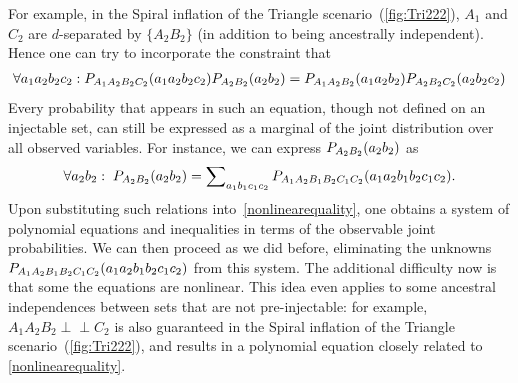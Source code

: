 \documentclass[aps,english,superscriptaddress,onecolumn,twoside,longbibliography,pra,floatfix,fleqn,nofootinbib]{revtex4-1}%
\theoremstyle{definition}
\newcommand{\p}[2][]{{P_{#1}}\parenths{#2}}
\newcommand{\indep}{\perp\!\!\!\!\perp} %
\DeclarePairedDelimiter{\parenths}{\lparen}{\rparen}
\begin{document}
For example, in the Spiral inflation of the Triangle scenario~(\cref{fig:Tri222}), $A_1$ and $C_2$ are $d$-separated by $\{A_2 B_2\}$ (in addition to being ancestrally independent). Hence one can try to incorporate the constraint that 
\begin{align}\label{nonlinearequality}
\forall{a_1 a_2 b_2 c_2}: \p[A_1 A_2 B_2 C_2]{a_1 a_2 b_2 c_2}\p[A_2 B_2]{a_2 b_2}=\p[A_1 A_2 B_2]{a_1 a_2 b_2}\p[A_2 B_2 C_2]{a_2 b_2 c_2}
\end{align}
 Every probability that appears in such an equation, though not defined on an injectable set, can still be expressed as a marginal of the joint distribution over all observed variables.  For instance, we can express $\p[A_2 B_2]{a_2 b_2}$ as
\begin{align}
\forall{a_2 b_2}:\;\p[A_2 B_2]{a_2 b_2} = \sum\nolimits_{a_1 b_1 c_1 c_2}\p[A_1 A_2 B_1 B_2 C_1 C_2]{a_1 a_2 b_1 b_2 c_1 c_2}.
\end{align}
Upon substituting such relations into~\cref{nonlinearequality}, one obtains a system of polynomial equations and inequalities in terms of the observable joint probabilities.  We can then proceed as we did before, eliminating the unknowns $\p[A_1 A_2 B_1 B_2 C_1 C_2]{a_1 a_2 b_1 b_2 c_1 c_2}$ from this system. The additional difficulty now is that some the equations are nonlinear. This idea even applies to some ancestral independences between sets that are not pre-injectable: for example, $A_1 A_2 B_2 \indep C_2$ is also guaranteed in the Spiral inflation of the Triangle scenario~(\cref{fig:Tri222}), and results in a polynomial equation closely related to \cref{nonlinearequality}.
\end{document}
